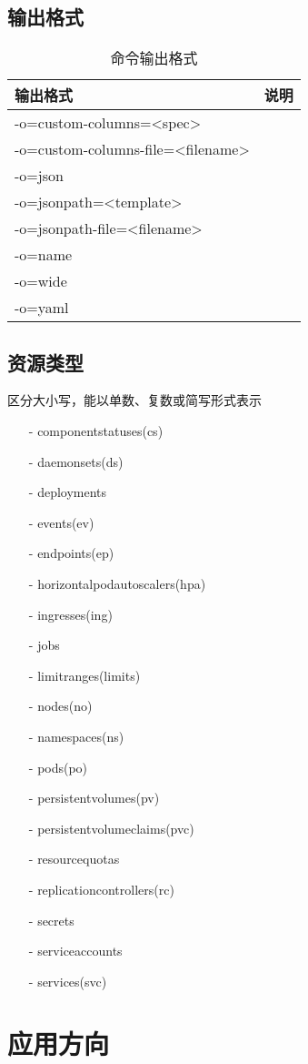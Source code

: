 \documentclass{ctexart}
\begin{document}
\subsection{输出格式}
\begin{table}[H]
	\centering
	\caption{命令输出格式}
	\begin{tabular}{|l|c|}
		\hline
		输出格式 & 说明\\\hline
		-o=custom-columns=<spec> & \\\hline
		-o=custom-columns-file=<filename> & \\\hline
		-o=json & \\\hline
		-o=jsonpath=<template> & \\\hline
		-o=jsonpath-file=<filename> & \\\hline
		-o=name & \\\hline
		-o=wide & \\\hline
		-o=yaml & \\\hline
	\end{tabular}
\end{table}



\subsection{资源类型}
区分大小写，能以单数、复数或简写形式表示


\begin{enumerate}
	\item [-] componentstatuses(cs)
	\item [-] daemonsets(ds)
	\item [-] deployments
	\item [-] events(ev)
	\item [-] endpoints(ep)
	\item [-] horizontalpodautoscalers(hpa)
	\item [-] ingresses(ing)
	\item [-] jobs
	\item [-] limitranges(limits)
	\item [-] nodes(no)
	\item [-]namespaces(ns)
	\item [-] pods(po)
	\item [-] persistentvolumes(pv)
	\item [-] persistentvolumeclaims(pvc)
	\item [-] resourcequotas
	\item [-] replicationcontrollers(rc)
	\item [-] secrets
	\item [-] serviceaccounts
	\item [-] services(svc)
	
	
\end{enumerate}


\section{应用方向}
\end{document}
